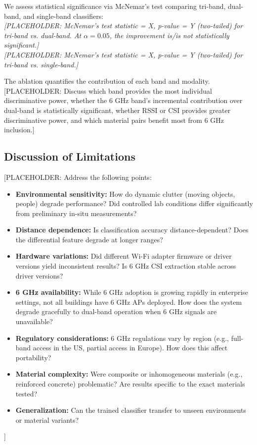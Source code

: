 \documentclass[conference]{IEEEtran}
\begin{document}
We assess statistical significance via McNemar's test comparing tri-band, dual-band, and single-band classifiers: \\
\textit{[PLACEHOLDER: McNemar's test statistic = X, p-value = Y (two-tailed) for tri-band vs. dual-band. At $\alpha = 0.05$, the improvement is/is not statistically significant.]} \\
\textit{[PLACEHOLDER: McNemar's test statistic = X, p-value = Y (two-tailed) for tri-band vs. single-band.]}

The ablation quantifies the contribution of each band and modality. [PLACEHOLDER: Discuss which band provides the most individual discriminative power, whether the 6 GHz band's incremental contribution over dual-band is statistically significant, whether RSSI or CSI provides greater discriminative power, and which material pairs benefit most from 6 GHz inclusion.]

\subsection{Discussion of Limitations}

[PLACEHOLDER: Address the following points:
\begin{itemize}
    \item \textbf{Environmental sensitivity:} How do dynamic clutter (moving objects, people) degrade performance? Did controlled lab conditions differ significantly from preliminary in-situ measurements?
    \item \textbf{Distance dependence:} Is classification accuracy distance-dependent? Does the differential feature degrade at longer ranges?
    \item \textbf{Hardware variations:} Did different Wi-Fi adapter firmware or driver versions yield inconsistent results? Is 6 GHz CSI extraction stable across driver versions?
    \item \textbf{6 GHz availability:} While 6 GHz adoption is growing rapidly in enterprise settings, not all buildings have 6 GHz APs deployed. How does the system degrade gracefully to dual-band operation when 6 GHz signals are unavailable?
    \item \textbf{Regulatory considerations:} 6 GHz regulations vary by region (e.g., full-band access in the US, partial access in Europe). How does this affect portability?
    \item \textbf{Material complexity:} Were composite or inhomogeneous materials (e.g., reinforced concrete) problematic? Are results specific to the exact materials tested?
    \item \textbf{Generalization:} Can the trained classifier transfer to unseen environments or material variants?
\end{itemize}
]
\end{document}

